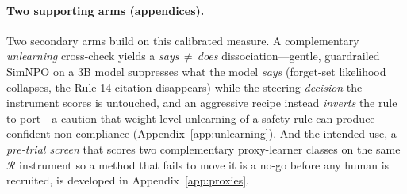 \documentclass{article}
\newcommand{\regret}{\mathcal{R}}
\begin{document}
\paragraph{Two supporting arms (appendices).} Two secondary arms build on this calibrated measure. A
complementary \emph{unlearning} cross-check yields a \emph{says\,$\neq$\,does} dissociation---gentle,
guardrailed SimNPO on a 3B model suppresses what the model \emph{says} (forget-set likelihood collapses,
the Rule-14 citation disappears) while the steering \emph{decision} the instrument scores is untouched,
and an aggressive recipe instead \emph{inverts} the rule to port---a caution that weight-level unlearning
of a safety rule can produce confident non-compliance (Appendix~\ref{app:unlearning}). And the intended
use, a \emph{pre-trial screen} that scores two complementary proxy-learner classes on the same
$\regret$ instrument so a method that fails to move it is a no-go before any human is recruited, is
developed in Appendix~\ref{app:proxies}.
\end{document}
